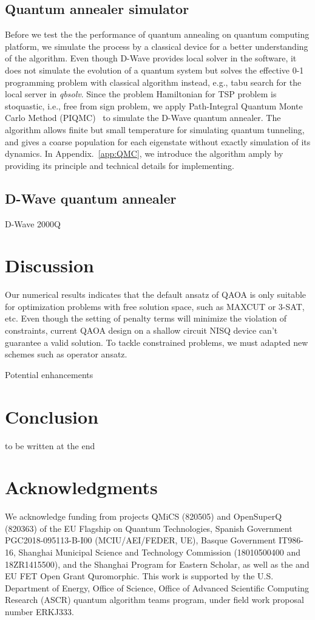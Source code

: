 \documentclass[aps,pra,twocolumn,superscriptaddress]{revtex4-2}
\begin{document}
\subsection{Quantum annealer simulator}
Before we test the the performance of quantum annealing on quantum computing platform, we simulate the process by a classical device for a better understanding of the algorithm. Even though D-Wave provides local solver in the software, it does not simulate the evolution of a quantum system but solves the effective 0-1 programming problem with classical algorithm instead, e.g., tabu search for the local server in \textit{qbsolv}. Since the problem Hamiltonian for TSP problem is stoquastic, i.e., free from sign problem, we apply Path-Integral Quantum Monte Carlo Method (PIQMC)~\cite{path_integral} to simulate the D-Wave quantum annealer. The algorithm allows finite but small temperature for simulating quantum tunneling, and gives a coarse population for each eigenstate without exactly simulation of its dynamics. In Appendix.~\ref{app:QMC}, we introduce the algorithm amply by providing its principle and technical details for implementing.


\subsection{D-Wave quantum annealer}
D-Wave 2000Q

\section{Discussion}
Our numerical results indicates that the default ansatz of QAOA is only suitable for optimization problems with free solution space, such as MAXCUT or 3-SAT, etc. Even though the setting of penalty terms will minimize the violation of constraints, current QAOA design on a shallow circuit NISQ device can't guarantee a valid solution. To tackle constrained problems, we must adapted new schemes such as operator ansatz.

Potential enhancements
\section{Conclusion}
to be written at the end
\section{Acknowledgments}
We acknowledge funding from projects QMiCS (820505) and OpenSuperQ (820363) of the EU Flagship on Quantum Technologies,  Spanish Government PGC2018-095113-B-I00 (MCIU/AEI/FEDER, UE), Basque Government IT986-16, Shanghai Municipal Science and Technology Commission (18010500400 and 18ZR1415500), and the Shanghai Program for Eastern Scholar, as well as the and EU FET Open Grant Quromorphic. This work is supported by the U.S. Department of Energy, Office of Science, Office of Advanced Scientific Computing Research (ASCR) quantum algorithm teams program, under field work proposal number ERKJ333.
\end{document}
